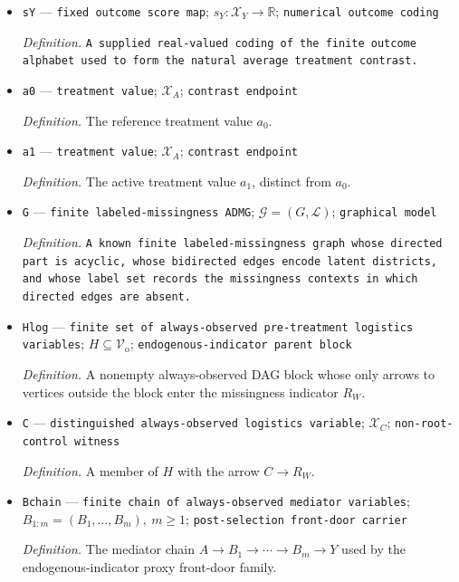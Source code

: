 \documentclass{article}
\begin{document}
\begin{itemize}
  \item \texttt{sY} --- \texttt{fixed outcome score map}; \(s_Y:\mathcal X_Y\to\mathbb R\); \texttt{numerical outcome coding}
  \par\smallskip\noindent\emph{Definition.} \texttt{A supplied real-\allowbreak{}valued coding of the finite outcome alphabet used to form the natural average treatment contrast.}
  \item \texttt{a0} --- \texttt{treatment value}; \(\mathcal X_A\); \texttt{contrast endpoint}
  \par\smallskip\noindent\emph{Definition.} The reference treatment value \(a_0\).
  \item \texttt{a1} --- \texttt{treatment value}; \(\mathcal X_A\); \texttt{contrast endpoint}
  \par\smallskip\noindent\emph{Definition.} The active treatment value \(a_1\), distinct from \(a_0\).
  \item \texttt{G} --- \texttt{finite labeled-\allowbreak{}missingness ADMG}; \(\mathcal G=(G,\mathcal L)\); \texttt{graphical model}
  \par\smallskip\noindent\emph{Definition.} \texttt{A known finite labeled-\allowbreak{}missingness graph whose directed part is acyclic,\allowbreak{} whose bidirected edges encode latent districts,\allowbreak{} and whose label set records the missingness contexts in which directed edges are absent.}
  \item \texttt{Hlog} --- \texttt{finite set of always-\allowbreak{}observed pre-\allowbreak{}treatment logistics variables}; \(H\subseteq\mathcal V_{\mathrm o}\); \texttt{endogenous-\allowbreak{}indicator parent block}
  \par\smallskip\noindent\emph{Definition.} A nonempty always-observed DAG block whose only arrows to vertices outside the block enter the missingness indicator \(R_W\).
  \item \texttt{C} --- \texttt{distinguished always-\allowbreak{}observed logistics variable}; \(\mathcal X_C\); \texttt{non-\allowbreak{}root-\allowbreak{}control witness}
  \par\smallskip\noindent\emph{Definition.} A member of \(H\) with the arrow \(C\to R_W\).
  \item \texttt{Bchain} --- \texttt{finite chain of always-\allowbreak{}observed mediator variables}; \(B_{1:m}=(B_1,\ldots,B_m),\ m\geq1\); \texttt{post-\allowbreak{}selection front-\allowbreak{}door carrier}
  \par\smallskip\noindent\emph{Definition.} The mediator chain \(A\to B_1\to\cdots\to B_m\to Y\) used by the endogenous-indicator proxy front-door family.

\end{itemize}
\end{document}
